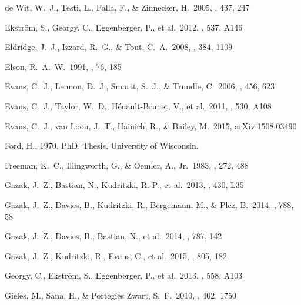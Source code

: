\documentclass[useAMS,usenatbib]{mn2e}
\begin{document}
\begin{thebibliography}{99}
 de Wit, W.~J., Testi, L., Palla, F., \& Zinnecker, H.\ 2005, \aap, 437, 247

 Ekstr{\"o}m, S., Georgy, C., Eggenberger, P., et al.\ 2012, \aap, 537, A146

 Eldridge, J.~J.,
Izzard, R.~G., \& Tout, C.~A.\ 2008, \mnras, 384, 1109

 Elson, R.~A.~W.\ 1991, \apjs,
76, 185

 Evans, C.~J., Lennon, D.~J., Smartt, S.~J., \& Trundle, C.\ 2006, \aap, 456, 623

 Evans, C.~J., Taylor, W.~D., H{\'e}nault-Brunet, V., et al.\ 2011, \aap, 530, A108

 Evans, C.~J., van Loon,
J.~T., Hainich, R., \& Bailey, M.\ 2015, arXiv:1508.03490

 Ford, H., 1970, PhD. Thesis, University of Wisconsin.

 Freeman, K.~C.,
Illingworth, G., \& Oemler, A., Jr.\ 1983, \apj, 272, 488

 Gazak, J.~Z., Bastian,
N., Kudritzki, R.-P., et al.\ 2013, \mnras, 430, L35

 Gazak, J.~Z., Davies, B.,
Kudritzki, R., Bergemann, M., \& Plez, B.\ 2014, \apj, 788, 58

 Gazak, J.~Z., Davies, B.,
Bastian, N., et al.\ 2014, \apj, 787, 142

 Gazak, J.~Z., Kudritzki,
R., Evans, C., et al.\ 2015, \apj, 805, 182

 Georgy, C., Ekstr{\"o}m, S., Eggenberger, P., et al.\ 2013, \aap, 558, A103

 Gieles, M., Sana, H.,
\& Portegies Zwart, S.~F.\ 2010, \mnras, 402, 1750



\end{thebibliography}
\end{document}
